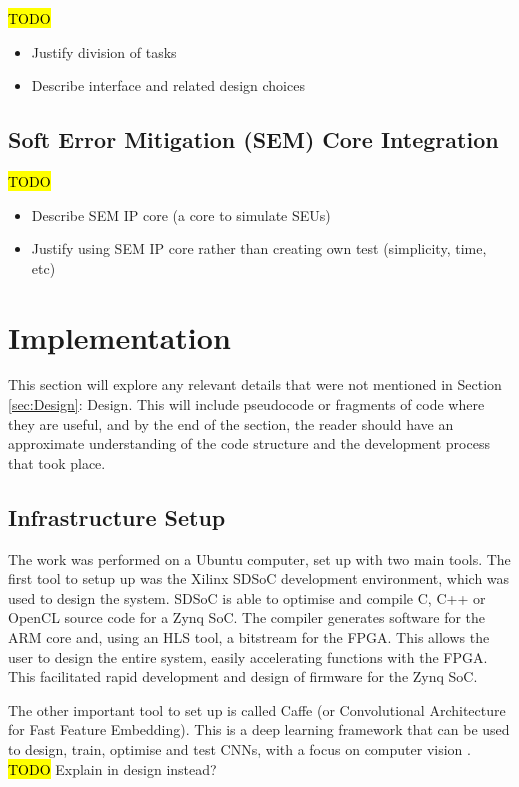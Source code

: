 \documentclass[12pt]{article}
\begin{document}
\hl{TODO}

\begin{itemize}
\item Justify division of tasks
\item Describe interface and related design choices
\end{itemize}

\subsection{Soft Error Mitigation (SEM) Core Integration}
\label{sec:Design-SEM}

\hl{TODO}

\begin{itemize}
\item Describe SEM IP core (a core to simulate SEUs)
\item Justify using SEM IP core rather than creating own test (simplicity, time, etc)
\end{itemize}

\newpage

\section{Implementation}
\label{sec:Imp}


This section will explore any relevant details that were not mentioned in Section \ref{sec:Design}: Design. This will include pseudocode or fragments of code where they are useful, and by the end of the section, the reader should have an approximate understanding of the code structure and the development process that took place.

\subsection{Infrastructure Setup}
\label{sec:Imp-InfSetup}


The work was performed on a Ubuntu computer, set up with two main tools. The first tool to setup up was the Xilinx SDSoC development environment, which was used to design the system. SDSoC is able to optimise and compile C, C++ or OpenCL source code for a Zynq SoC. The compiler generates software for the ARM core and, using an HLS tool, a bitstream for the FPGA. This allows the user to design the entire system, easily accelerating functions with the FPGA. This facilitated rapid development and design of firmware for the Zynq SoC.

The other important tool to set up is called Caffe (or Convolutional Architecture for Fast Feature Embedding). This is a deep learning framework that can be used to design, train, optimise and test CNNs, with a focus on computer vision \cite{jia2014caffe}. \hl{TODO} Explain in design instead?
\end{document}
